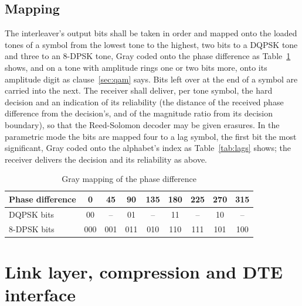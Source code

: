 \documentclass[a4paper,11pt]{article}
\newcommand{\thd}[1]{\textbf{#1}}
\begin{document}
\subsection{Mapping}\label{sec:mapping}
The interleaver's output bits shall be taken in order and mapped onto the
loaded tones of a symbol from the lowest tone to the highest, two bits to
a DQPSK tone and three to an 8-DPSK tone, Gray coded onto the phase
difference as Table~\ref{tab:gray} shows, and on a tone with amplitude
rings one or two bits more, onto its amplitude digit as
clause~\ref{sec:qam} says.  Bits left over at the end of a
symbol are carried into the next.  The receiver shall deliver, per tone
symbol, the hard decision and an indication of its reliability (the
distance of the received phase difference from the decision's, and of
the magnitude ratio from its decision boundary), so that
the Reed-Solomon decoder may be given erasures.  In the parametric mode
the bits are mapped four to a lag symbol, the first bit the most
significant, Gray coded onto the alphabet's index as Table~\ref{tab:lags}
shows; the receiver delivers the decision and its reliability as above.

\begin{table}[htbp]
\caption{Gray mapping of the phase difference}
\label{tab:gray}
\small
\begin{tabular}{lcccccccc}
\toprule
\rowcolor{ituhead}\thd{Phase difference} & 0 & 45 & 90 & 135 & 180 & 225 & 270 & 315 \\
\midrule
DQPSK bits & 00 & -- & 01 & -- & 11 & -- & 10 & -- \\
8-DPSK bits & 000 & 001 & 011 & 010 & 110 & 111 & 101 & 100 \\
\bottomrule
\end{tabular}
\end{table}

\section{Link layer, compression and DTE interface}\label{sec:dte}
\end{document}
